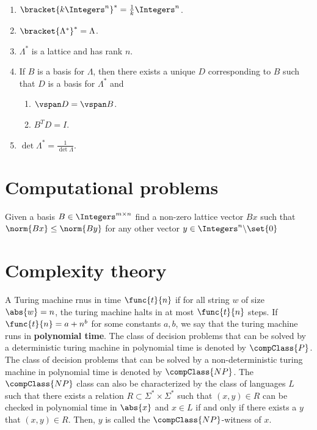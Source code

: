 \begin{proposition}\ 
    \begin{enumerate}
        \item \(\bracket{k \Integers^n}^{\ast} = \frac{1}{k} \Integers^n\).
        \item \(\bracket{\Lambda^{\ast}}^{\ast} = \Lambda\).
        \item \(\Lambda^{\ast}\) is a lattice and has rank \(n\).
        \item If \(B\) is a basis for \(\Lambda\), then there exists a unique \(D\) corresponding to \(B\) such that \(D\) is a basis for \(\Lambda^{\ast}\) and 
        \begin{enumerate}
            \item \(\vspan D = \vspan B\).
            \item \(B^T D = I\).
        \end{enumerate}
        \item \(\det \Lambda^{\ast} = \frac{1}{\det \Lambda}\).
    \end{enumerate}
\end{proposition}

\section{Computational problems}
\begin{definition}
    Given a basis \(B \in \Integers^{m \times n}\) find a non-zero lattice vector \(Bx\) such that \(\norm{Bx} \leq \norm{By}\) for any other vector \(y \in \Integers^{n} \backslash \set{0}\)
\end{definition}
\section{Complexity theory}
A Turing machine rnus in time \(\func{t}{n}\) if for all string \(w\) of size \(\abs{w} = n\), the turing machine halts in at most \(\func{t}{n}\) steps. If \(\func{t}{n} = a + n^b\) for some constants \(a,b\), we say that the turing machine runs in \textbf{polynomial time}. The class of decision problems that can be solved by a deterministic turing machine in polynomial time is denoted by \(\compClass{P}\). The class of decision problems that can be solved by a non-deterministic turing machine in polynomial time is denoted by \(\compClass{NP}\). The \(\compClass{NP}\) class can also be characterized by the class of languages \(L\) such that there exists a relation \(R \subset \Sigma^{\ast} \times \Sigma^{\ast}\) such that \((x,y) \in R\) can be checked in polynomial time in \(\abs{x}\) and \(x \in L\) if and only if there exists a \(y\) that \((x,y) \in R\). Then, \(y\) is called the \(\compClass{NP}\)-witness of \(x\).


